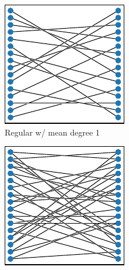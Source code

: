\begin{figure}
\begin{center}
\begin{minipage}{0.95\textwidth}
\begin{minipage}{\textwidth}
\begin{minipage}{0.05\linewidth}
\large
{}
\end{minipage}%
\begin{minipage}{0.95\linewidth}
\begin{subfigure}[b]{0.5\textwidth}
\centering
\includegraphics[width=\textwidth]{img/graph_layouts/title=regular-1+ext=}%
\caption{
Regular w/ mean degree 1
}
\label{fig:regular_degree_1}
\label{fig:regular_1}
\end{subfigure}
\begin{subfigure}[b]{0.5\textwidth}
\centering
\includegraphics[width=\textwidth]{img/graph_layouts/title=regular-2+ext=}%

\end{subfigure}
\end{minipage}
\end{minipage}
\end{minipage}
\end{center}
\end{figure}
